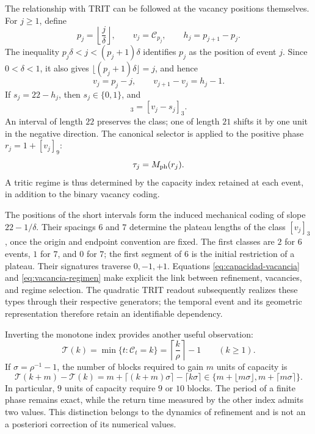 The relationship with TRIT can be followed at the vacancy positions themselves.
For \(j\geq1\), define
\[
 p_j=\left\lfloor\frac j\delta\right\rfloor,\qquad
 v_j=\mathcal C_{p_j},\qquad h_j=p_{j+1}-p_j.
\]
The inequality \(p_j\delta<j<(p_j+1)\delta\) identifies \(p_j\)
as the position of event \(j\). Since \(0<\delta<1\), it also gives
\(\lfloor(p_j+1)\delta\rfloor=j\), and hence
\[
 v_j=p_j-j,\qquad
 v_{j+1}-v_j=h_j-1.
\]
If \(s_j=22-h_j\), then \(s_j\in\{0,1\}\), and
\begin{equation}
 [v_{j+1}]_3=[v_j-s_j]_3.
 \label{eq:vacancia-regimen}
\end{equation}
An interval of length \(22\) preserves the class; one of length
\(21\) shifts it by one unit in the negative direction. The canonical selector
is applied to the positive phase \(r_j=1+[v_j]_9\):
\[
 \tau_j=M_{\rm ph}(r_j).
\]
A tritic regime is thus determined by the capacity index
retained at each event, in addition to the binary vacancy coding.

The positions of the short intervals form the induced mechanical coding
of slope \(22-1/\delta\). Their spacings \(6\) and \(7\)
determine the plateau lengths of the class \([v_j]_3\), once the
origin and endpoint convention are fixed. The first classes
are \(2\) for \(6\) events, \(1\) for \(7\), and \(0\) for
\(7\); the first segment of \(6\) is the initial restriction of a plateau.
Their signatures traverse \(0,-1,+1\). Equations
\eqref{eq:capacidad-vacancia} and \eqref{eq:vacancia-regimen} make explicit the
link between refinement, vacancies, and regime selection. The quadratic
TRIT readout subsequently realizes these types through their respective
generators; the temporal event and its geometric representation
therefore retain an identifiable dependency.

Inverting the monotone index provides another useful observation:
\[
 \mathcal T(k)=\min\{t:\mathcal C_t=k\}
   =\left\lceil\frac k\rho\right\rceil-1\qquad(k\geq1).
\]
If \(\sigma=\rho^{-1}-1\), the number of blocks required to gain
\(m\) units of capacity is
\[
 \mathcal T(k+m)-\mathcal T(k)
 =m+\lceil(k+m)\sigma\rceil-\lceil k\sigma\rceil
 \in\{m+\lfloor m\sigma\rfloor,m+\lceil m\sigma\rceil\}.
\]
In particular, \(9\) units of capacity require \(9\) or \(10\)
blocks. The period of a finite phase remains exact, while the
return time measured by the other index admits two values. This
distinction belongs to the dynamics of refinement and is not an
a posteriori correction of its numerical values.
